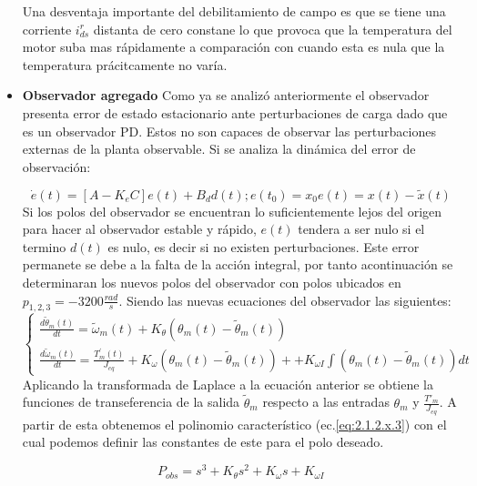 \documentclass[10pt]{article}
\begin{document}
\begin{itemize}
	Una desventaja importante del debilitamiento de campo es que se tiene una corriente $i^{r}_{ds}$ distanta de cero constane lo que provoca que la temperatura del motor suba mas rápidamente a comparación con cuando esta es nula que la temperatura prácitcamente no varía.
	
	\item \textbf{Observador agregado}
	Como ya se analizó anteriormente el observador presenta error de estado estacionario ante perturbaciones de carga dado que es un observador PD. 
	Estos no son capaces de observar las perturbaciones externas de la planta observable. Si se analiza la dinámica del error de observación:

	\begin{equation}
		\dot{e}(t)=[A-K_{e}C]e(t)+B_{d}d(t); e(t_{0})=x_{0}
		e(t)=x(t)-\tilde{x}(t)
		\label{eq:2.1.2.x.1}
	\end{equation}
	Si los polos del observador se encuentran lo suficientemente lejos del origen para hacer al observador estable y rápido, $e(t)$ tendera a ser nulo si el termino $d(t)$ es nulo, es decir si no existen perturbaciones. Este error permanete se debe a la falta de la acción integral, por tanto acontinuación se determinaran
	los nuevos polos del observador con polos ubicados en $p_{1,2,3}=-3200 \frac{rad}{s}$. 
	Siendo las nuevas ecuaciones del observador las siguientes:
	\begin{equation}
		\left\{\begin{matrix}
			\frac{d\tilde{\theta}_{m}(t)}{dt}=\tilde{\omega}_{m}(t)+K_{\theta}(\theta_{m}(t)-\tilde{\theta}_{m}(t))\\
			\frac{d\tilde{\omega}_{m}(t)}{dt}=\frac{T^{'}_{m}(t)}{J_{eq}}+K_{\omega}(\theta_{m}(t)-\tilde{\theta}_{m}(t))++K_{\omega I}\int (\theta_{m}(t)-\tilde{\theta}_{m}(t))dt
			
			\end{matrix}\right.
			\label{eq:2.1.2.x.2}
	\end{equation}
	Aplicando la transformada de Laplace a la ecuación anterior se obtiene la funciones de transeferencia de la salida $\tilde{\theta}_{m}$ respecto a las entradas $\theta_{m}$ y $\frac{T'_{m}}{J_{eq}}$. A partir de esta obtenemos el polinomio característico (ec.\ref{eq:2.1.2.x.3}) con el cual podemos definir las constantes de este para el polo deseado.

		\begin{equation}
		P_{obs}=s^{3}+K_{\theta}s^{2}+K_{\omega}s+K_{\omega I}
			\label{eq:2.1.2.x.3}
	\end{equation}


\end{itemize}
\end{document}
